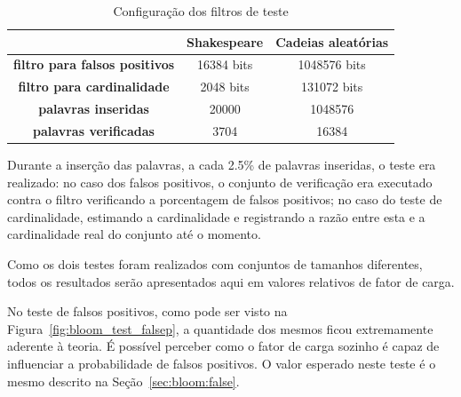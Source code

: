 \begin{table}[!htbp]
\begin{center}
	\begin{tabular}{ c | c | c }
		\hline 
		& {\bf Shakespeare} & {\bf Cadeias aleatórias} \\
		\hline 
		{\bf filtro para falsos positivos} & 16384 bits & 1048576 bits \\
		{\bf filtro para cardinalidade} & 2048 bits & 131072 bits \\
		{\bf palavras inseridas} & 20000 & 1048576 \\
		{\bf palavras verificadas} & 3704 & 16384 \\
		\hline 
	\end{tabular}
	\caption{Configuração dos filtros de teste}
	\label{table:bloom_test_setup}
\end{center}
\end{table}

Durante a inserção das palavras, a cada 2.5\% de palavras inseridas, o teste era realizado: no caso dos falsos positivos, o conjunto de verificação era executado contra o filtro verificando a porcentagem de falsos positivos; no caso do teste de cardinalidade, estimando a cardinalidade e registrando a razão entre esta e a cardinalidade real do conjunto até o momento.

Como os dois testes foram realizados com conjuntos de tamanhos diferentes, todos os resultados serão apresentados aqui em valores relativos de fator de carga.

No teste de falsos positivos, como pode ser visto na Figura~\ref{fig:bloom_test_falsep}, a quantidade dos mesmos ficou extremamente aderente à teoria. É possível perceber como o fator de carga sozinho é capaz de influenciar a probabilidade de falsos positivos. O valor esperado neste teste é o mesmo descrito na Seção~\ref{sec:bloom:false}.

